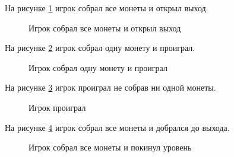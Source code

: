 На рисунке \ref{enter:image} игрок собрал все монеты и открыл выход.

\begin{figure}[ht]
\caption{Игрок собрал все монеты и открыл выход}
\label{enter:image}
\end{figure}

На рисунке \ref{enter1:image} игрок собрал одну монету и проиграл.

\begin{figure}[ht]
	\caption{Игрок собрал одну монету и проиграл}
	\label{enter1:image}
\end{figure}

На рисунке \ref{enter2:image} игрок проиграл не собрав ни одной монеты.

\begin{figure}[ht]
	\caption{Игрок проиграл}
	\label{enter2:image}
\end{figure}

На рисунке \ref{enter3:image} игрок собрал все монеты и добрался до выхода.

\begin{figure}[ht]
	\caption{Игрок собрал все монеты и покинул уровень}
	\label{enter3:image}
\end{figure}